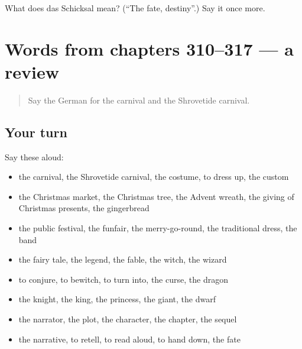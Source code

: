 \begin{tcolorbox}[breakable,colback=teal!4,colframe=teal!35!black,title={Before you move on}]
What does das Schicksal mean? (\textquotedblleft{}The fate, destiny\textquotedblright{}.) Say it once more.
\end{tcolorbox}
\section[(dialogue)]{Words from chapters 310–317 — a review}

\label{lesson:GE-R317-review-310-317}



\begin{quote}
Say the German for the carnival and the Shrovetide carnival.
\end{quote}

\subsection*{Your turn}
Say these aloud:

\begin{itemize}
\raggedright
  \item the carnival, the Shrovetide carnival, the costume, to dress up, the custom
  \item the Christmas market, the Christmas tree, the Advent wreath, the giving of Christmas presents, the gingerbread
  \item the public festival, the funfair, the merry-go-round, the traditional dress, the band
  \item the fairy tale, the legend, the fable, the witch, the wizard
  \item to conjure, to bewitch, to turn into, the curse, the dragon
  \item the knight, the king, the princess, the giant, the dwarf
  \item the narrator, the plot, the character, the chapter, the sequel
  \item the narrative, to retell, to read aloud, to hand down, the fate
\end{itemize}


